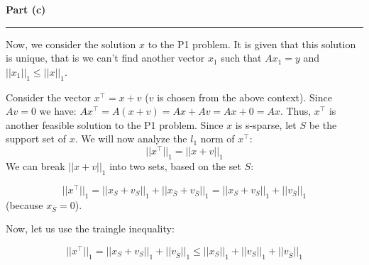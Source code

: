 \documentclass[a4paper,12pt]{article}
\newenvironment{solution}[2][]{%
    \begin{mdframed}[linecolor=blue!70!black, linewidth=2pt, roundcorner=10pt, backgroundcolor=yellow!10!white, skipabove=12pt, skipbelow=12pt]%
        \textbf{\large #2}
        \par\noindent\rule{\textwidth}{0.4pt}
}{
    \end{mdframed}
}
\begin{document}
\begin{solution}{Part (c)}
  Now, we consider the solution $x$ to the P1 problem. It is given that this solution is unique, that is we can't find another vector $x_1$ such that $Ax_1 = y$ and $||x_1||_1 \leq ||x||_1$.

  Consider the vector $x^\top = x + v$ ($v$ is chosen from the above context). Since $Av = 0$ we have: $Ax^\top = A(x + v) = Ax + Av = Ax + 0 = Ax$. Thus, $x^\top$ is another feasible solution to the P1 problem. Since $x$ is s-sparse, let $S$ be the support set of $x$. We will now analyze the $l_1$ norm of $x^\top$:
  \[
  ||x^\top||_1 = ||x+v||_1
  \]
  We can break $||x+v||_1$ into two sets, based on the set $S$:

  \[
    ||x^\top||_1 = ||x_S+v_S||_1 + ||x_{\bar{S}}+v_{\bar{S}}||_1 = ||x_S+v_S||_1 + ||v_{\bar{S}}||_1
  \]
  (because $x_{\bar{S}} = 0$).

  Now, let us use the traingle inequality:

  \[
    ||x^\top||_1 = ||x_S+v_S||_1 + ||v_{\bar{S}}||_1 \leq ||x_S||_1 + ||v_S||_1 + ||v_{\bar{S}}||_1
  \]

\end{solution}
\end{document}
